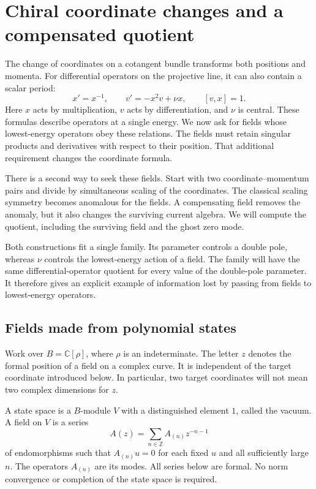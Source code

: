 \chapter{Chiral coordinate changes and a compensated quotient}
\label{chap:cc-chiral-collision}

The change of coordinates on a cotangent bundle transforms both positions and momenta.
For differential operators on the projective line, it can also contain a scalar period:
\[
 x'=x^{-1},\qquad v'=-x^2v+\nu x,\qquad [v,x]=1.
\]
Here $x$ acts by multiplication, $v$ acts by differentiation, and $\nu$ is central.
These formulas describe operators at a single energy.
We now ask for fields whose lowest-energy operators obey these relations.
The fields must retain singular products and derivatives with respect to their position.
That additional requirement changes the coordinate formula.

There is a second way to seek these fields.
Start with two coordinate--momentum pairs and divide by simultaneous scaling of the coordinates.
The classical scaling symmetry becomes anomalous for the fields.
A compensating field removes the anomaly, but it also changes the surviving current algebra.
We will compute the quotient, including the surviving field and the ghost zero mode.

Both constructions fit a single family.
Its parameter controls a double pole, whereas $\nu$ controls the lowest-energy action of a field.
The family will have the same differential-operator quotient for every value of the double-pole parameter.
It therefore gives an explicit example of information lost by passing from fields to lowest-energy operators.

\section{Fields made from polynomial states}

Work over $B=\mathbb C[\rho]$, where $\rho$ is an indeterminate.
The letter $z$ denotes the formal position of a field on a complex curve.
It is independent of the target coordinate introduced below.
In particular, two target coordinates will not mean two complex dimensions for $z$.

A state space is a $B$-module $V$ with a distinguished element $1$, called the vacuum.
A field on $V$ is a series
\[
 A(z)=\sum_{n\in\mathbb Z}A_{(n)}z^{-n-1}
\]
of endomorphisms such that $A_{(n)}u=0$ for each fixed $u$ and all sufficiently large $n$.
The operators $A_{(n)}$ are its modes.
All series below are formal.
No norm convergence or completion of the state space is required.

